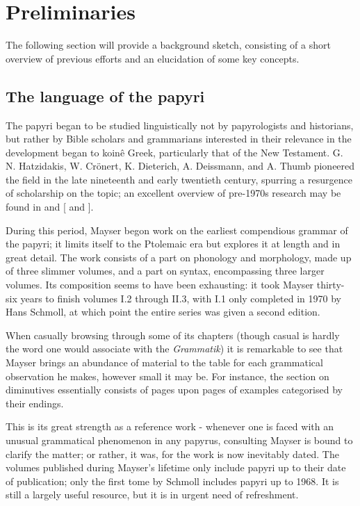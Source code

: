 \documentclass[10pt,a4paper,twoside,openright,titlepage,fleqn,%
               headinclude,,footinclude,BCOR5mm,%
               numbers=noenddot,cleardoublepage=empty,%
               tablecaptionabove]{scrbook}
\begin{document}
\section{Preliminaries}

The following section will provide a background sketch, consisting of a short
overview of previous efforts and an elucidation of some key concepts.

\subsection{The language of the papyri}

The papyri began to be studied linguistically not by papyrologists and
historians, but rather by Bible scholars and grammarians interested in their
relevance in the development began to koin\^{e} Greek, particularly that of the
New Testament. G. N.  Hatzidakis, W. Cr\"onert, K. Dieterich, A. Deissmann, and
A.  Thumb pioneered the field in the late nineteenth and early twentieth
century, spurring a resurgence of scholarship on the topic; an excellent
overview of pre-1970s research may be found in \citet{mandilaras1973} and
\citeauthor{gignac1976} [\citeyear{gignac1976} and \citeyear{gignac1981}].

During this period, Mayser begon work on the earliest compendious grammar of
the papyri; it limits itself to the Ptolemaic era but explores it at length and
in great detail.  The work consists of a part on phonology and morphology, made
up of three slimmer volumes, and a part on syntax, encompassing three larger
volumes. Its composition seems to have been exhausting: it took Mayser
thirty-six years to finish volumes I.2 through II.3, with I.1 only completed in
1970 by Hans Schmoll, at which point the entire series was given a second
edition.

When casually browsing through some of its chapters (though casual is hardly
the word one would associate with the \textit{Grammatik}) it is remarkable to see
that Mayser brings an abundance of material to the table for each grammatical
observation he makes, however small it may be. For instance, the section on
diminutives essentially consists of pages upon pages of examples categorised by
their endings.

This is its great strength as a reference work - whenever one is faced with an
unusual grammatical phenomenon in any papyrus, consulting Mayser is bound to
clarify the matter; or rather, it was, for the work is now inevitably dated.
The volumes published during Mayser's lifetime only include papyri up to their
date of publication; only the first tome by Schmoll includes papyri up to 1968.
It is still a largely useful resource, but it is in urgent need of refreshment.
\end{document}
